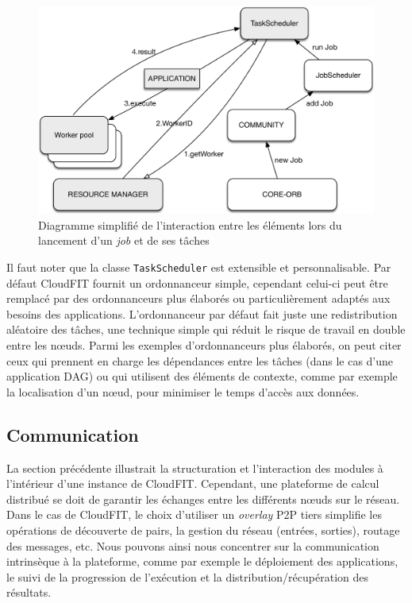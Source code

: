 \begin{figure}
	\centering
		\includegraphics[width=0.65\linewidth]{img/CloudFITstack-app}
		\caption{Diagramme simplifié de l'interaction entre les éléments lors du lancement d'un \textit{job} et de ses tâches}\label{Figure:applayer}
\end{figure}

Il faut noter que la classe \texttt{TaskScheduler} est extensible et personnalisable. Par défaut CloudFIT fournit un ordonnanceur simple, cependant celui-ci peut être remplacé par des ordonnanceurs plus élaborés ou particulièrement adaptés aux besoins des applications. L'ordonnanceur par défaut fait juste une redistribution aléatoire des tâches, une technique simple qui réduit le risque de travail en double entre les n{\oe}uds. Parmi les exemples d'ordonnanceurs plus élaborés, on peut citer ceux qui prennent en charge les dépendances entre les tâches (dans le cas d'une application DAG) ou qui utilisent des éléments de contexte, comme par exemple la localisation d'un n{\oe}ud, pour minimiser le temps d'accès aux données. 




\subsection{Communication\label{subsec:commCloudFIT}}

La section précédente illustrait la structuration et l'interaction des modules à l'intérieur d'une instance de CloudFIT. Cependant, une plateforme de calcul distribué se doit de garantir les échanges entre les différents n{\oe}uds sur le réseau. Dans le cas de CloudFIT, le choix d'utiliser un \textit{overlay} P2P tiers simplifie les opérations de découverte de pairs, la gestion du réseau (entrées, sorties), routage des messages, etc. Nous pouvons ainsi nous concentrer sur la communication intrinsèque à la plateforme, comme par exemple le déploiement des applications, le suivi de la progression de l'exécution et la distribution/récupération des résultats. 

